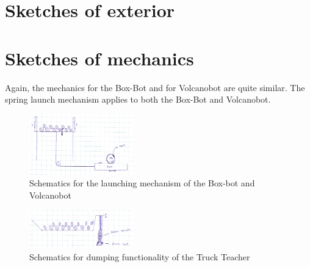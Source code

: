 \documentclass[11pt,twoside,a4paper]{report}
\begin{document}
\section{Sketches of exterior}

\section{Sketches of mechanics}
Again, the mechanics for the Box-Bot and for Volcanobot are quite similar. The spring launch mechanism applies to both the Box-Bot and Volcanobot.
\begin{figure}
  \begin{center}
    \includegraphics[width=0.4\textwidth]{Images/launchmechschematic.jpg}
  \end{center}
  \caption{Schematics for the launching mechanism of the Box-bot and Volcanobot}
  \label{figure:launchscheme}
\end{figure}
\begin{figure}[h]
  \begin{center}
    \includegraphics[width=0.4\textwidth]{Images/tipmechschematic.jpg}
  \end{center}
  \caption{Schematics for dumping functionality of the Truck Teacher}
  \label{figure:tipscheme}
\end{figure}
\end{document}
